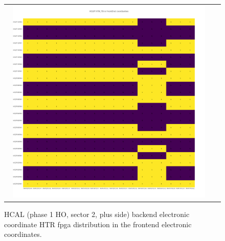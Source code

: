 \begin{figure}[htb]
 \begin{center}
  \begin{tabular}{cc}
   \includegraphics[angle=0,width=0.95\textwidth]{figures/appendix/HO2P_HTR_TB_in_FrontEnd.png}
  \end{tabular}
  \caption{HCAL (phase 1 HO, sector 2, plus side) backend electronic coordinate HTR fpga distribution in the frontend electronic coordinates.}
  \label{fig:lmapHO2PHTRTBFEC}
 \end{center}
\end{figure}
\clearpage


